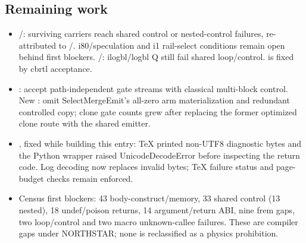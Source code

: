 \subsection*{Remaining work}
\begin{itemize}
  \item {}/: surviving carriers reach shared control
  or nested-control failures, re-attributed to /.
  i80/speculation and i1 rail-select conditions remain open behind first blockers.
  /: ilogbl/logbl Q still fail shared loop/control.
   is fixed by cbrtl acceptance.
  \item {}: accept path-independent gate streams with classical
  multi-block control. New : omit SelectMergeEmit's all-zero arm
  materialization and redundant controlled copy; clone gate counts grew after
  replacing the former optimized clone route with the shared emitter.
  \item {}, fixed while building this entry: TeX printed non-UTF8
  diagnostic bytes and the Python wrapper raised UnicodeDecodeError before
  inspecting the return code. Log decoding now replaces invalid bytes; TeX
  failure status and page-budget checks remain enforced.
  \item Census first blockers: 43 body-construct/memory, 33 shared control
  (13 nested), 18 undef/poison returns, 14 argument/return ABI, nine frem gaps,
  two loop/control and two macro unknown-callee failures. These are compiler
  gaps under NORTHSTAR; none is reclassified as a physics prohibition.
\end{itemize}
